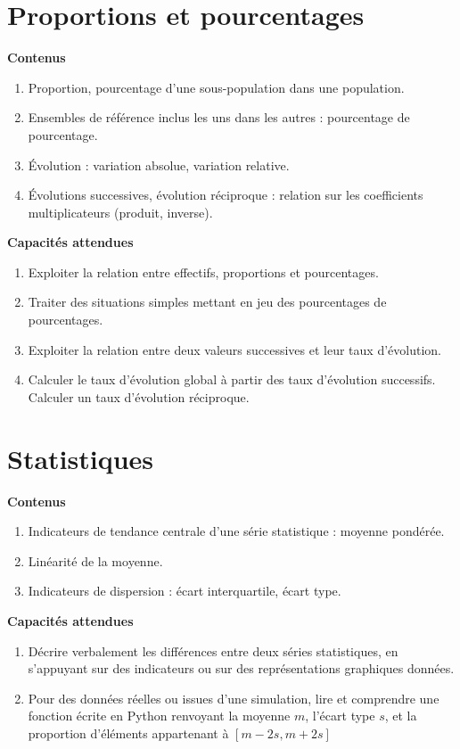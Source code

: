\documentclass[10pt,a4paper]{article}
\begin{document}
\section{Proportions et pourcentages}

\textbf{Contenus}

\begin{enumerate}
\item Proportion, pourcentage d’une sous-population dans une population.
\item  Ensembles de référence inclus les uns dans les autres : pourcentage de 
pourcentage.
\item  Évolution : variation absolue, variation relative.
\item  Évolutions successives, évolution réciproque : relation sur les coefficients 
multiplicateurs (produit, inverse).
\end{enumerate}

\textbf{Capacités attendues}
 
\begin{enumerate}
\item  Exploiter la relation entre effectifs, proportions et pourcentages.
\item  Traiter des situations simples mettant en jeu des pourcentages de pourcentages.
\item  Exploiter la relation entre deux valeurs successives et leur taux d’évolution.
\item  Calculer le taux d’évolution global à partir des taux d’évolution successifs. Calculer un taux d’évolution réciproque.
\end{enumerate}

 
 
\section{Statistiques}

\textbf{Contenus}

\begin{enumerate}
\item Indicateurs de tendance centrale d’une série statistique : moyenne pondérée.
\item  Linéarité de la moyenne.
\item  Indicateurs de dispersion : écart interquartile, écart type.
\end{enumerate}

\textbf{Capacités attendues}
 
\begin{enumerate}
\item Décrire verbalement les différences entre deux séries statistiques, en s’appuyant sur 
des indicateurs ou sur des représentations graphiques données.
\item Pour des données réelles ou issues d’une simulation, lire et comprendre une fonction 
écrite en Python renvoyant la moyenne $m$, l’écart type $s$, et la proportion d’éléments 
appartenant à $[m - 2s,m + 2s]$
\end{enumerate}
 
\end{document}
